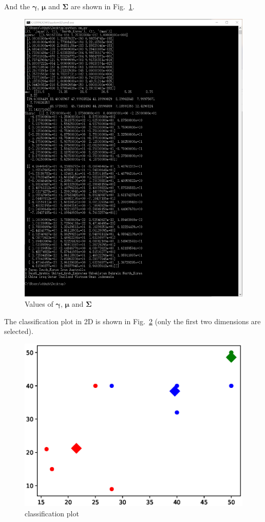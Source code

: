 ﻿\documentclass[a4paper, 11pt]{article}
\numberwithin{equation}{subsection}
\begin{document}
And the $\boldsymbol\gamma$, $\boldsymbol\mu$ and $\boldsymbol\Sigma$ are shown in Fig.~\ref{fig:params}.
\begin{figure}[H]
\centering
\includegraphics[width=0.9\linewidth]{fig/params.png}
\caption{Values of $\boldsymbol\gamma$, $\boldsymbol\mu$ and $\boldsymbol\Sigma$}
\label{fig:params}
\end{figure}

The classification plot in 2D is shown in Fig.~\ref{fig:res} (only the first two dimensions are selected).
\begin{figure}[H]
\centering
\includegraphics[width=0.7\linewidth]{fig/result.eps}
\caption{classification plot}
\label{fig:res}
\end{figure}
\end{document}
